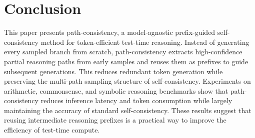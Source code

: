 \section{Conclusion}

This paper presents path-consistency, a model-agnostic prefix-guided self-consistency method for token-efficient test-time reasoning. Instead of generating every sampled branch from scratch, path-consistency extracts high-confidence partial reasoning paths from early samples and reuses them as prefixes to guide subsequent generations. This reduces redundant token generation while preserving the multi-path sampling structure of self-consistency. Experiments on arithmetic, commonsense, and symbolic reasoning benchmarks show that path-consistency reduces inference latency and token consumption while largely maintaining the accuracy of standard self-consistency. These results suggest that reusing intermediate reasoning prefixes is a practical way to improve the efficiency of test-time compute.